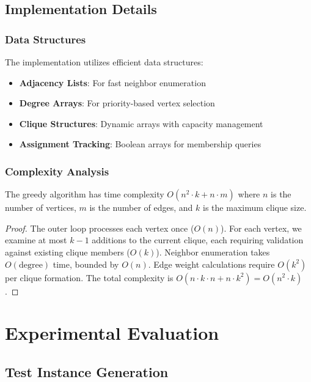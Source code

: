 \documentclass[12pt,a4paper]{article}
\begin{document}
\subsection{Implementation Details}

\subsubsection{Data Structures}

The implementation utilizes efficient data structures:

\begin{itemize}
    \item \textbf{Adjacency Lists}: For fast neighbor enumeration
    \item \textbf{Degree Arrays}: For priority-based vertex selection
    \item \textbf{Clique Structures}: Dynamic arrays with capacity management
    \item \textbf{Assignment Tracking}: Boolean arrays for membership queries
\end{itemize}

\subsubsection{Complexity Analysis}

\begin{theorem}
The greedy algorithm has time complexity $O(n^2 \cdot k + n \cdot m)$ where $n$ is the number of vertices, $m$ is the number of edges, and $k$ is the maximum clique size.
\end{theorem}

\begin{proof}
The outer loop processes each vertex once ($O(n)$). For each vertex, we examine at most $k-1$ additions to the current clique, each requiring validation against existing clique members ($O(k)$). Neighbor enumeration takes $O(\text{degree})$ time, bounded by $O(n)$. Edge weight calculations require $O(k^2)$ per clique formation. The total complexity is $O(n \cdot k \cdot n + n \cdot k^2) = O(n^2 \cdot k)$.
\end{proof}

\section{Experimental Evaluation}

\subsection{Test Instance Generation}
\end{document}
